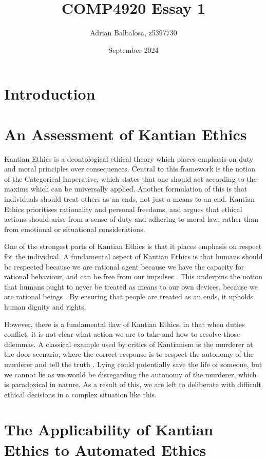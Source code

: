\documentclass{article}
\title{COMP4920 Essay 1}
\author{Adrian Balbalosa, z5397730}
\date{September 2024}
\begin{document}
\maketitle

\section{Introduction}

\section{An Assessment of Kantian Ethics}
Kantian Ethics is a deontological ethical theory which places emphasis on duty and
moral principles over consequences. Central to this framework is the notion of the
Categorical Imperative, which states that one should act according to the maxims which
can be universally applied. Another formulation of this is that individuals should treat
others as an ends, not just a means to an end. Kantian Ethics prioritises rationality and
personal freedoms, and argues that ethical actions should arise from a sense of duty and
adhering to moral law, rather than from emotional or situational considerations.

One of the strongest parts of Kantian Ethics is that it places emphasis on respect
for the individual. A fundamental aspect of Kantian Ethics is that 
humans should be respected because we are rational agent because we have the 
capacity for rational behaviour, and can be free from our impulses \parencite[p. 77]{bennet2015}.
This underpins the notion that humans ought to never be treated as means to our own devices,
because we are rational beings \parencite[p. 77]{bennet2015}. By ensuring that people are treated as
an ends, it upholds human dignity and rights.

However, there is a fundamental flaw of Kantian Ethics, in that when duties conflict, it is
not clear what action we are to take and how to resolve those dilemmas. A classical example used by
critics of Kantianism is the murderer at the door scenario, where the correct response is to respect
the autonomy of the murderer and tell the truth \parencite[p. 81]{bennet2015}. Lying could potentially 
save the life of someone, but we cannot lie as we would be disregarding the autonomy of the murderer, which
is paradoxical in nature. As a result of this, we are left to deliberate with difficult ethical decisions in
a complex situation like this.
\section{The Applicability of Kantian Ethics to Automated Ethics}
\end{document}
